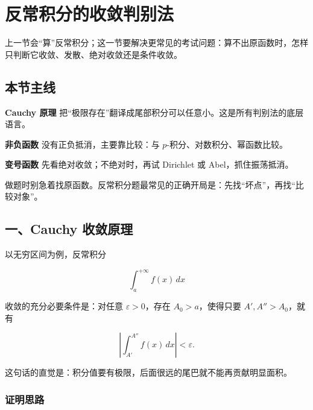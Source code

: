 \section{反常积分的收敛判别法}

上一节会“算”反常积分；这一节要解决更常见的考试问题：算不出原函数时，怎样只判断它收敛、发散、绝对收敛还是条件收敛。

\subsection*{本节主线}

\begin{conceptbox}
\textbf{Cauchy 原理}
把“极限存在”翻译成尾部积分可以任意小。这是所有判别法的底层语言。
\end{conceptbox}

\begin{conceptbox}
\textbf{非负函数}
没有正负抵消，主要靠比较：与 \(p\)-积分、对数积分、幂函数比较。
\end{conceptbox}

\begin{conceptbox}
\textbf{变号函数}
先看绝对收敛；不绝对时，再试 Dirichlet 或 Abel，抓住振荡抵消。
\end{conceptbox}

\begin{notebox}
做题时别急着找原函数。反常积分题最常见的正确开局是：先找“坏点”，再找“比较对象”。
\end{notebox}

\subsection*{一、Cauchy 收敛原理}

以无穷区间为例，反常积分

\[
      \int_a^{+\infty}f(x)\,dx
    \]

收敛的充分必要条件是：对任意 \(\varepsilon>0\)，存在 \(A_0>a\)，使得只要 \(A',A''>A_0\)，就有

\[
      \left|\int_{A'}^{A''}f(x)\,dx\right|<\varepsilon.
    \]

这句话的直觉是：积分值要有极限，后面很远的尾巴就不能再贡献明显面积。

\subsubsection*{证明思路}

